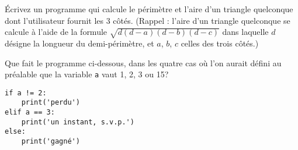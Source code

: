 \begin{question}
Écrivez un programme qui calcule le périmètre et l’aire d’un triangle quelconque
dont l’utilisateur fournit les 3 côtés.
(Rappel : l’aire d’un triangle quelconque se calcule à l’aide de la formule
$\sqrt{d(d-a)(d-b)(d-c)}$ dans laquelle $d$ désigne la longueur du
demi-périmètre, et $a$, $b$, $c$ celles des trois côtés.)
\end{question}

\begin{question}
Que fait le programme ci-dessous, dans les quatre cas où l'on aurait défini au
préalable que la variable \texttt{a} vaut 1, 2, 3 ou 15?
\begin{verbatim}
if a != 2: 
    print('perdu')
elif a == 3:
    print('un instant, s.v.p.')
else: 
    print('gagné')
\end{verbatim}
\end{question}

